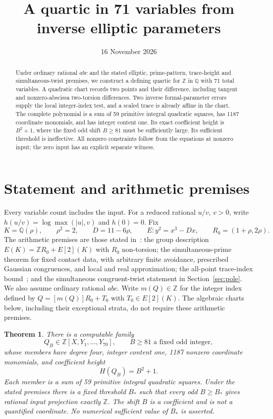 \documentclass[11pt,a4paper]{article}
\title{A quartic in 71 variables from inverse elliptic parameters}
\author{}\date{16 November 2026}
\newtheorem{theorem}{Theorem}[section]
\newcommand{\Q}{\mathbb Q}\newcommand{\Z}{\mathbb Z}
\begin{document}
\maketitle
\begin{abstract}
Under ordinary rational $abc$ and the stated elliptic, prime-pattern,
trace-height and simultaneous-twist premises, we construct a defining
quartic for $\Z$ in $\Q$ with 71 total variables. A quadratic chart
records two points and their difference, including tangent and
nonzero-abscissa two-torsion differences. Two inverse formal-parameter
errors supply the local integer-index test, and a scaled trace is
already affine in the chart. The complete polynomial is a sum of
59 primitive integral quadratic squares, has 1187 coordinate monomials,
and has integer content one. Its exact coefficient height is
$B^2+1$, where the fixed odd shift $B\ge81$ must be sufficiently
large. Its sufficient threshold is ineffective. All nonzero constraints
follow from the equations at nonzero input; the zero input has an
explicit separate witness.
\end{abstract}

\section{Statement and arithmetic premises}
Every variable count includes the input. For a reduced rational $u/v$,
$v>0$, write $h(u/v)=\log\max(|u|,v)$ and $h(0)=0$. Fix
\[
 K=\Q(\rho),\qquad \rho^2=2,\qquad D=11-6\rho,\qquad
 E:y^2=x^3-Dx,\qquad R_0=(1+\rho,2\rho).
\]
The arithmetic premises are those stated in~\cite{Arithmetic}: the
group description $E(K)=\Z R_0+E[2](K)$ with $R_0$ non-torsion;
the simultaneous-prime theorem for fixed contact data, with arbitrary
finite avoidance, prescribed Gaussian congruences, and local and real
approximation; the all-point trace-index bound~\cite{Trace}; and the
simultaneous congruent-twist statement in Section~\ref{sec:pole}.
We also assume ordinary rational $abc$. Write $m(Q)\in\Z$ for the
integer index defined by $Q=[m(Q)]R_0+T_0$ with $T_0\in E[2](K)$.
The algebraic charts below, including their exceptional strata,
do not require these arithmetic premises.

\begin{theorem}\label{thm:main}
There is a computable family
\[
 Q_B\in\Z[X,Y_1,\ldots,Y_{70}],\qquad
 B\ge81\text{ a fixed odd integer},
\]
whose members have degree four, integer content one, 1187 nonzero
coordinate monomials, and coefficient height
\[
                         H(Q_B)=B^2+1.
\]
Each member is a sum of 59 primitive integral quadratic squares.
Under the stated premises there is a fixed threshold $B_*$ such that
every odd $B\ge B_*$ gives rational input projection exactly $\Z$.
The shift $B$ is a coefficient and is not a quantified coordinate.
No numerical sufficient value of $B_*$ is asserted.
\end{theorem}
\end{document}
